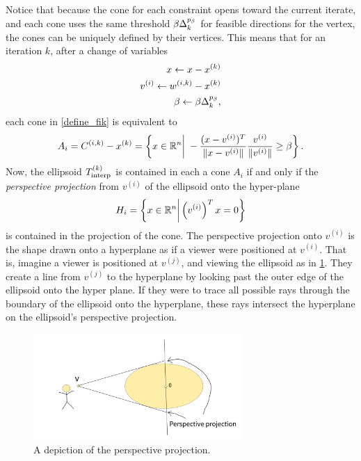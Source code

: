 Notice that because the cone for each constraint opens toward the current iterate,
and each cone uses the same threshold $\beta \Delta_k^{p_\beta}$ for feasible directions for the vertex,
the cones can be uniquely defined by their vertices.
This means that for an iteration $k$, after a change of variables
\begin{align}
x \gets x - x^{(k)} \\
v^{(i)}  \gets {w^{(i, k)}} - x^{(k)} \\
\beta \gets \beta \Delta_k^{p_{\beta}},
\end{align}
each cone in \cref{define_fik} is equivalent to
\begin{align*}
A_i = {C^{(i, k)}} - x^{(k)} = \left\{x\in\mathbb R^n\bigg|\;-\frac{(x - v^{(i)})^T}{\|x - v^{(i)}\|} \frac{v^{(i)}}{\|v^{(i)}\|} \ge \beta \right\}.
\end{align*}
Now, the ellipsoid ${T_{\text{interp}}^{(k)}}$ is contained in each a cone $A_i$ if and only if the \emph{perspective projection} from $v^{(i)}$ of the ellipsoid onto the hyper-plane 
\begin{align*}
H_i = \left\{x \in \mathbb R^n \bigg|\left(v^{(i)}\right)^Tx = 0\right\}
\end{align*}
is contained in the projection of the cone.
The perspective projection onto $v^{(i)}$ is the shape drawn onto a hyperplane as if a viewer were positioned at $v^{(i)}$.
That is, imagine a viewer is positioned at $v^{(j)}$, and viewing the ellipsoid as in \cref{perspective_projection_depiction}.
They create a line from $v^{(j)}$ to the hyperplane by looking past the outer edge of the ellipsoid onto the hyper plane.
If they were to trace all possible rays through the boundary of the ellipsoid onto the hyperplane, 
these rays intersect the hyperplane on the ellipsoid's perspective projection.


\begin{figure}[ht]
    \centering
    \includegraphics[width=300px]{images/perspective_projection.png}
    \caption{
    	A depiction of the perspective projection.
	}
    \label{perspective_projection_depiction}
\end{figure}

